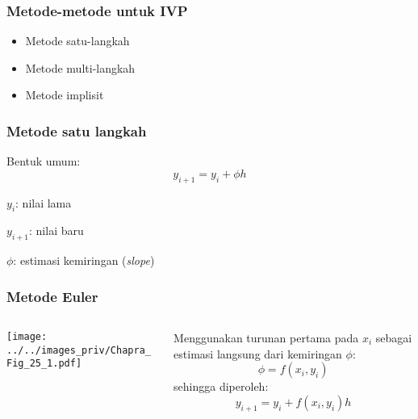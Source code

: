 
\begin{frame}
\frametitle{Metode-metode untuk IVP}
  
\begin{itemize}
\item Metode satu-langkah
\item Metode multi-langkah
\item Metode implisit
\end{itemize}

\end{frame}




\begin{frame}
\frametitle{Metode satu langkah}

Bentuk umum:
\begin{equation*}
y_{i+1} = y_{i} + \phi h
\end{equation*}

$y_{i}$: nilai lama

$y_{i+1}$: nilai baru

$\phi$: estimasi kemiringan (\textit{slope})

\end{frame}


\begin{frame}
\frametitle{Metode Euler}

\begin{columns}

\begin{column}{0.5\textwidth}
  {\centering
  \texttt{[image: ../../images\_priv/Chapra\_Fig\_25\_1.pdf]}
  \par}    
\end{column}

\begin{column}{0.5\textwidth}
  Menggunakan turunan pertama pada $x_i$ sebagai estimasi langsung dari kemiringan $\phi$:
  \begin{equation*}
  \phi = f(x_i, y_i)
  \end{equation*}
  sehingga diperoleh:
  \begin{equation*}
  y_{i+1} = y_{i} + f(x_i, y_i) h
  \end{equation*}
\end{column}

\end{columns}

\end{frame}


